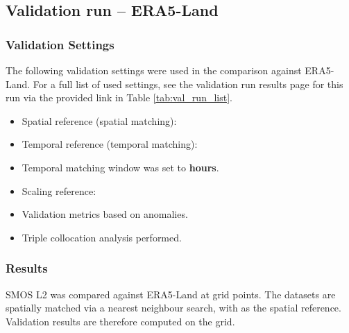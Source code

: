 \subsection{Validation run  -- ERA5-Land}


\subsubsection{Validation Settings}

The following validation settings were used in the comparison against ERA5-Land.
For a full list of used settings, see the validation run results page for this run via the provided link in Table \ref{tab:val_run_list}.

\begin{itemize}
    \item Spatial reference (spatial matching): \textbf{}
    \item Temporal reference (temporal matching): \textbf{}
    \item Temporal matching window was set to \textbf{ hours}.
    \item Scaling reference: \textbf{}
    \item Validation metrics  based on anomalies.
    \item Triple collocation analysis  performed.
\end{itemize}

\subsubsection{Results}

\noindent \ac{SMOS} \ac{L2} was compared against ERA5-Land at  grid points.
The datasets are spatially matched via a nearest neighbour search, with  as the spatial reference.
Validation results are therefore computed on the  grid.

